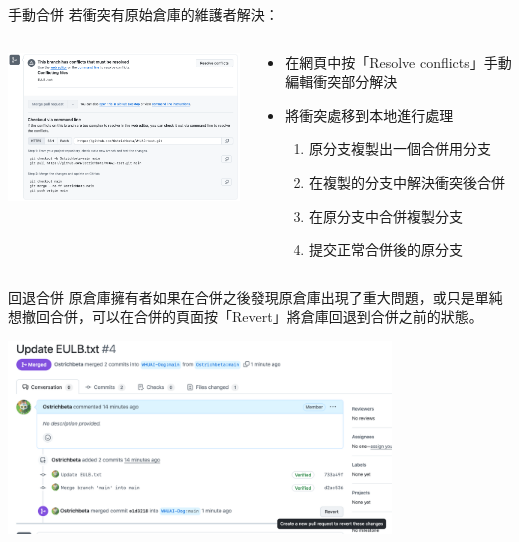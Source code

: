 \documentclass[xetex, unicode, 10pt, aspectratio=169]{beamer}
\begin{document}
\begin{frame}{手動合併}
    若衝突有原始倉庫的維護者解決：
    \begin{columns}
        \begin{column}{0.6\textwidth}
            \begin{center}
                \includegraphics[width=3.5in]{./img/github-merge-pull-request-manually.png}
            \end{center}
        \end{column}
        \begin{column}{0.4\textwidth}
            \begin{itemize}
                \item 在網頁中按「Resolve conflicts」手動編輯衝突部分解決
                \item 將衝突處移到本地進行處理
                    \begin{enumerate}
                        \item 原分支複製出一個合併用分支
                        \item 在複製的分支中解決衝突後合併
                        \item 在原分支中合併複製分支
                        \item 提交正常合併後的原分支
                    \end{enumerate}
            \end{itemize}
        \end{column}
    \end{columns}
\end{frame}

\begin{frame}{回退合併}
    原倉庫擁有者如果在合併之後發現原倉庫出現了重大問題，或只是單純想撤回合併，可以在合併的頁面按「Revert」將倉庫回退到合併之前的狀態。
    \begin{center}
        \includegraphics[width=4in]{./img/github-revert-pull-request.png}
    \end{center}
\end{frame}
\end{document}
